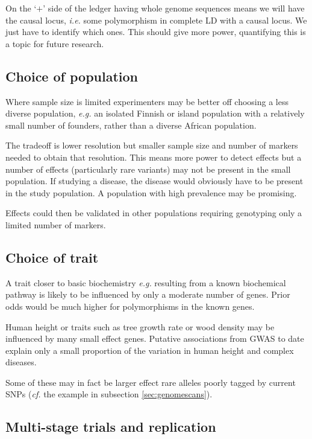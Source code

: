 \documentclass[a4paper,10pt]{amsart}
\def\ie{\textit{i.e.}}
\def\eg{\textit{e.g.}}
\def\cf{\textit{cf.}}
\begin{document}
On the `$+$' side of the ledger having whole genome sequences means we
will have the causal locus, \ie{} some polymorphism in complete LD with
a causal locus.  We just have to identify which ones. This should give
more power, quantifying this is a topic for future research.

\subsection{Choice of population}

Where sample size is limited experimenters may be better off choosing
a less diverse population, \eg{} an isolated Finnish or island
population with a relatively small number of founders, rather than a
diverse African population.

The tradeoff is lower resolution but smaller sample size and number of
markers needed to obtain that resolution. This means more power to
detect effects but a number of effects (particularly rare variants)
may not be present in the small population. If studying a disease, the
disease would obviously have to be present in the study population. A
population with high prevalence may be promising.

Effects could then be validated in other populations requiring genotyping only
a limited number of markers.

\subsection{Choice of trait} 

A trait closer to basic biochemistry \eg{} resulting from a known
biochemical pathway is likely to be influenced by only a moderate
number of 
genes. Prior odds would be much higher for
polymorphisms in the known genes.

Human height or traits such as tree growth rate or wood density may be
influenced by many small effect genes. Putative associations from GWAS
to date explain only a small proportion of the variation in human
height and complex diseases.

Some of these may in fact be larger effect rare alleles poorly tagged
by current SNPs (\cf{}  the example in subsection
\ref{sec:genomescans}).


\subsection{Multi-stage trials and replication}
\end{document}
